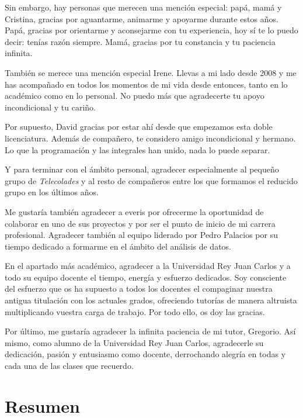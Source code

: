 \documentclass[a4paper, 12pt]{book}
\begin{document}
Sin embargo, hay personas que merecen una mención especial: papá, mamá y Cristina, gracias por aguantarme, animarme y apoyarme durante estos años. Papá, gracias por orientarme y aconsejarme con tu experiencia, hoy sí te lo puedo decir: tenías razón siempre. Mamá, gracias por tu constancia y tu paciencia infinita.

También se merece una mención especial Irene. Llevas a mi lado desde 2008 y me has acompañado en todos los momentos de mi vida desde entonces, tanto en lo académico como en lo personal. No puedo más que agradecerte tu apoyo incondicional y tu cariño.

Por supuesto, David gracias por estar ahí desde que empezamos esta doble licenciatura. Además de compañero, te considero amigo incondicional y hermano. Lo que la programación y las integrales han unido, nada lo puede separar.

Y para terminar con el ámbito personal, agradecer especialmente al pequeño grupo de \textit{Telecolades} y al resto de compañeros entre los que formamos el reducido grupo en los últimos años.

Me gustaría también agradecer a everis por ofrecerme la oportunidad de colaborar en uno de sus proyectos y por ser el punto de inicio de mi carrera profesional. Agradecer también al equipo liderado por Pedro Palacios por su tiempo dedicado a formarme en el ámbito del análisis de datos.

En el apartado más académico, agradecer a la Universidad Rey Juan Carlos y a todo su equipo docente el tiempo, energía y esfuerzo dedicados. Soy consciente del esfuerzo que os ha supuesto a todos los docentes el compaginar nuestra antigua titulación con los actuales grados, ofreciendo tutorías de manera altruista multiplicando vuestra carga de trabajo. Por todo ello, os doy las gracias.

Por último, me gustaría agradecer la infinita paciencia de mi tutor, Gregorio. Así mismo, como alumno de la Universidad Rey Juan Carlos, agradecerle su dedicación, pasión y entusiasmo como docente, derrochando alegría en todas y cada una de las clases que recuerdo.


\chapter*{Resumen}
\end{document}
